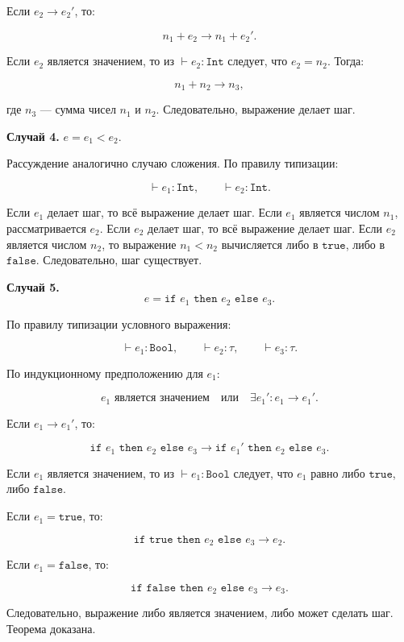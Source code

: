 \documentclass[12pt,a4paper]{article}
\begin{document}
Если \(e_2 \to e_2'\), то:

\[
n_1 + e_2 \to n_1 + e_2'.
\]

Если \(e_2\) является значением, то из \(\vdash e_2 : \texttt{Int}\) следует, что
\(e_2 = n_2\). Тогда:

\[
n_1 + n_2 \to n_3,
\]

где \(n_3\) --- сумма чисел \(n_1\) и \(n_2\). Следовательно, выражение делает шаг.

\textbf{Случай 4.} \(e = e_1 < e_2\).

Рассуждение аналогично случаю сложения. По правилу типизации:

\[
\vdash e_1 : \texttt{Int},
\qquad
\vdash e_2 : \texttt{Int}.
\]

Если \(e_1\) делает шаг, то всё выражение делает шаг. Если \(e_1\) является числом
\(n_1\), рассматривается \(e_2\). Если \(e_2\) делает шаг, то всё выражение делает шаг.
Если \(e_2\) является числом \(n_2\), то выражение \(n_1 < n_2\) вычисляется либо в
\(\texttt{true}\), либо в \(\texttt{false}\). Следовательно, шаг существует.

\textbf{Случай 5.}
\[
e = \texttt{if } e_1 \texttt{ then } e_2 \texttt{ else } e_3.
\]

По правилу типизации условного выражения:

\[
\vdash e_1 : \texttt{Bool},
\qquad
\vdash e_2 : \tau,
\qquad
\vdash e_3 : \tau.
\]

По индукционному предположению для \(e_1\):

\[
e_1 \text{ является значением}
\quad \text{или} \quad
\exists e_1' : e_1 \to e_1'.
\]

Если \(e_1 \to e_1'\), то:

\[
\texttt{if } e_1 \texttt{ then } e_2 \texttt{ else } e_3
\to
\texttt{if } e_1' \texttt{ then } e_2 \texttt{ else } e_3.
\]

Если \(e_1\) является значением, то из \(\vdash e_1 : \texttt{Bool}\) следует, что
\(e_1\) равно либо \(\texttt{true}\), либо \(\texttt{false}\).

Если \(e_1 = \texttt{true}\), то:

\[
\texttt{if true then } e_2 \texttt{ else } e_3 \to e_2.
\]

Если \(e_1 = \texttt{false}\), то:

\[
\texttt{if false then } e_2 \texttt{ else } e_3 \to e_3.
\]

Следовательно, выражение либо является значением, либо может сделать шаг.
Теорема доказана.
\end{document}
